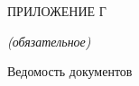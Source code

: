 \lstset{style=pythoninlinestyle}


\begin{center}
	ПРИЛОЖЕНИЕ Г
	
	\textit{(обязательное)}
\end{center}


\begin{center}
	Ведомость документов
\end{center}

